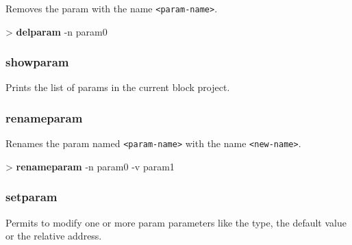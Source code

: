 \documentclass[10pt,a4paper]{article}
\begin{document}
Removes the param with the name \texttt{<param-name>}.\\


\begin{sampletitle}
> \textbf{\tool{} delparam} -n param0
\end{sampletitle}


\subsubsection{showparam}
\label{subsec:showparam}

Prints the list of params in the current block project.

\subsubsection{renameparam}
\label{subsec:renameparam}

Renames the param named \texttt{<param-name>} with the name \texttt{<new-name>}.\\


\begin{sampletitle}
> \textbf{\tool{} renameparam} -n param0 -v param1
\end{sampletitle}


\subsubsection{setparam}
\label{subsec:setparam}

Permits to modify one or more param parameters like the type, the default value or the relative address.\\
\end{document}
